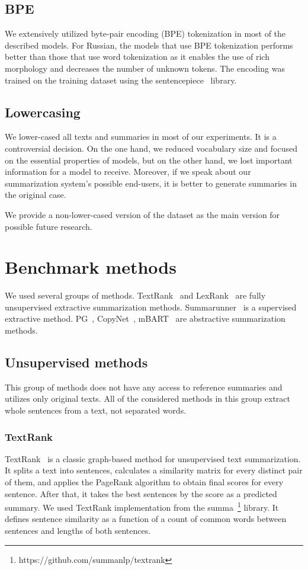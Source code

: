 \documentclass[runningheads]{llncs}
\begin{document}
\subsection{BPE}
We extensively utilized byte-pair encoding (BPE) tokenization in most of the described models. For Russian, the models that use BPE tokenization performs better than those that use word tokenization as it enables the use of rich morphology and decreases the number of unknown tokens. The encoding was trained on the training dataset using the sentencepiece~\cite{sentencepiece} library.

\subsection{Lowercasing}
We lower-cased all texts and summaries in most of our experiments. It is a controversial decision. On the one hand, we reduced vocabulary size and focused on the essential properties of models, but on the other hand, we lost important information for a model to receive. Moreover, if we speak about our summarization system's possible end-users, it is better to generate summaries in the original case.

We provide a non-lower-cased version of the dataset as the main version for possible future research.

\section{Benchmark methods}
We used several groups of methods. TextRank~\cite{textrank} and LexRank~\cite{lexrank} are fully unsupervised extractive summarization methods. Summarunner~\cite{summarunner} is a supervised extractive method. PG~\cite{pg}, CopyNet~\cite{copynet}, mBART~\cite{mbart} are abstractive summarization methods.

\subsection{Unsupervised methods}
This group of methods does not have any access to reference summaries and utilizes only original texts. All of the considered methods in this group extract whole sentences from a text, not separated words.

\subsubsection{TextRank}
TextRank~\cite{textrank}  is a classic graph-based method for unsupervised text summarization. It splits a text into sentences, calculates a similarity matrix for every distinct pair of them, and applies the PageRank algorithm to obtain final scores for every sentence. After that, it takes the best sentences by the score as a predicted summary. We used TextRank implementation from the summa~\cite{summa}\footnote{https://github.com/summanlp/textrank} library. It defines sentence similarity as a function of a count of common words between sentences and lengths of both sentences.
\end{document}
